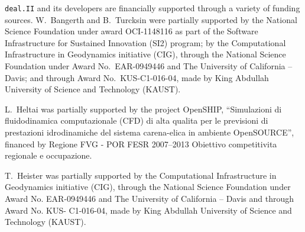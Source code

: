 \documentclass{siamltex}
\newcommand{\specialword}[1]{\texttt{#1}}
\newcommand{\dealii}{{\specialword{deal.II}}}
\begin{document}
\dealii{} and its developers are financially supported through a
variety of funding sources. W.~Bangerth and B.~Turcksin were partially
supported by the National Science Foundation under award OCI-1148116
as part of the Software Infrastructure for Sustained Innovation (SI2)
program; by the Computational Infrastructure in Geodynamics initiative
(CIG), through the National Science Foundation under Award
No.~EAR-0949446 and The University of California -- Davis; and through
Award No.~KUS-C1-016-04, made by King Abdullah University of Science
and Technology (KAUST). 

L.~Heltai was partially supported by the project OpenSHIP,
``Simulazioni di fluidodinamica computazionale (CFD) di alta qualita
per le previsioni di prestazioni idrodinamiche del sistema
carena-elica in ambiente OpenSOURCE'', financed by Regione FVG - POR
FESR 2007–2013 Obiettivo competitivita regionale e occupazione.

T.~Heister was partially supported by the Computational Infrastructure in
Geodynamics initiative (CIG), through the National Science Foundation under Award
No. EAR-0949446 and The University of California -- Davis and through Award No. KUS-
C1-016-04, made by King Abdullah University of Science and Technology (KAUST).

{}

\end{document}
